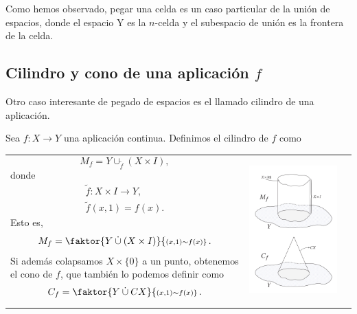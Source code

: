 Como hemos observado, pegar una celda es un caso particular de la unión de espacios, donde el espacio Y es la $n$-celda y el subespacio de unión es la frontera de la celda. 
\subsection*{Cilindro y cono de una aplicación $f$}
Otro caso interesante de pegado de espacios es el llamado cilindro de una aplicación. \par
Sea $f: X \longrightarrow Y$ una aplicación continua. Definimos el cilindro de $f$ como \par
\begin{tabular}{ll}
\begin{minipage}{0.5\textwidth}
\[M_f = Y \cup_{\tilde{f}} (X \times I), \] 
donde
\begin{align*}
\tilde{f} : X \times I \longrightarrow Y ,\\
\tilde{f}(x,1) = f(x).
\end{align*}
Esto es, 
\[ M_f = \faktor{Y \: \dot{\cup} \: (X \times I)}{\scriptstyle(x,1) \sim f(x)} \, . \]
Si además colapsamos $X \times \{0\}$ a un punto, obtenemos el cono de $f$, que también lo podemos definir como 
\[ C_f = \faktor{Y \: \dot{\cup} \: CX}{\scriptstyle (x,1) \sim f(x)} \, . \]
\end{minipage}
&
\begin{minipage}{0.5\textwidth}
\centering
\includegraphics[width = 0.9\textwidth]{images/cilindyconodef}
\end{minipage}
\end{tabular}

